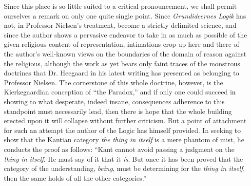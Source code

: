 \documentclass[12pt,a4paper,openany]{book}
\newcommand{\opage}[1]{\marginnote{\footnotesize\textit{[#1]}}}
\begin{document}
\opage{41}Since this place is so little suited to a critical pronouncement,
we shall permit ourselves a remark on only one quite single point.
Since \emph{Grundideernes Logik} has not, in Professor Nielsen's
treatment, become a strictly delimited science, and since the author
shows a pervasive endeavor to take in as much as possible of the
given religious content of representation, intimations crop up here
and there of the author's well-known views on the boundaries of the
domain of reason against the religious, although the work as yet
bears only faint traces of the monstrous doctrines that Dr. Heegaard
in his latest writing has presented as belonging to Professor
Nielsen. The cornerstone of this whole doctrine, however, is the
Kierkegaardian conception of ``the Paradox,'' and if only one could
succeed in showing to what desperate, indeed insane, consequences
adherence to this standpoint must necessarily lead, then there is hope
that the whole building erected upon it will collapse without further
criticism. But a point of attachment for such an attempt the author
of the Logic has himself provided. In seeking to show that the Kantian
category \emph{the thing in itself} is a mere phantom of mist, he
conducts the proof as follows: ``Kant cannot avoid passing a judgment
on the \emph{thing in itself}. He must say of it that it \emph{is}. But
once it has been proved that the category of the understanding,
\emph{being}, must be determining for the \emph{thing in itself}, then
the same holds of all the other categories.''
\end{document}
